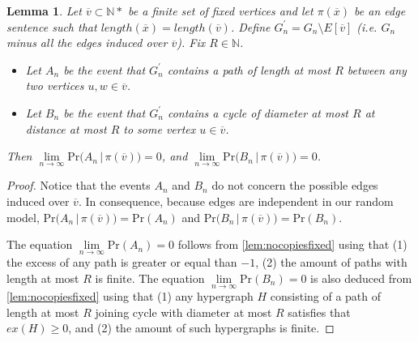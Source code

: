 \documentclass[12pt,notitlepage,a4paper]{article}
\newtheorem{lemma}{Lemma}[section]
\theoremstyle{definition}
\newcommand{\N}{\mathbb{N}}
\newcommand{\Ln}{\lim\limits_{n\to \infty}}
\begin{document}
\begin{lemma}
	Let $\overline{v} \subset \N*$ be a finite set of fixed vertices and let 
	$\pi(\overline{x})$ be an edge sentence such that
	$length(\overline{x})=length(\overline{v})$. 
	Define $G_n^\prime=G_n \setminus E[\overline{v}]$ (i.e. $G_n$ minus all the
	edges induced over $\overline{v}$). Fix $R\in \N$. 
	\begin{itemize}
		\item Let $A_n$ be the event that $G^\prime_n$ contains a path of 
		length	at most	$R$ between any two vertices $u,w\in \overline{v}$.
		\item Let $B_n$ be the event
		that $G^\prime_n$ contains a cycle of diameter at most $R$
		at distance at most $R$ to some vertex $u\in \overline{v}$.
	\end{itemize}
	Then $\Ln \mathrm{Pr}\big(A_n \, | \, \pi(\overline{v})\big)=0$, and 
	$\Ln \mathrm{Pr}\big(B_n \, | \, \pi(\overline{v})\big)=0$. 
\end{lemma}
\begin{proof}
	Notice that the events $A_n$ and $B_n$ do not concern the possible edges
	induced over $\overline{v}$. In consequence, because edges are independent
	in our random model, 
	$\mathrm{Pr}\big(A_n \, | \, \pi(\overline{v})\big)
	=\mathrm{Pr}(A_n)$ and 
	$\mathrm{Pr}\big(B_n \, | \, \pi(\overline{v})\big)
	=\mathrm{Pr}(B_n)$.\par
	The equation $\Ln \mathrm{Pr}(A_n)=0$ follows from
	 \cref{lem:nocopiesfixed} using that 
	(1) the excess of any path is greater or equal than $-1$,
	(2) the amount of paths with length at most $R$ is finite.
	The equation $\Ln \mathrm{Pr}(B_n)=0$ is also deduced from
	\cref{lem:nocopiesfixed} using that
	(1) any hypergraph $H$ consisting
	of a path of length at most $R$ joining cycle with diameter at most 
	$R$ satisfies that $ex(H)\geq 0$, and (2) the
	amount of such hypergraphs is finite. 
\end{proof}
\end{document}
